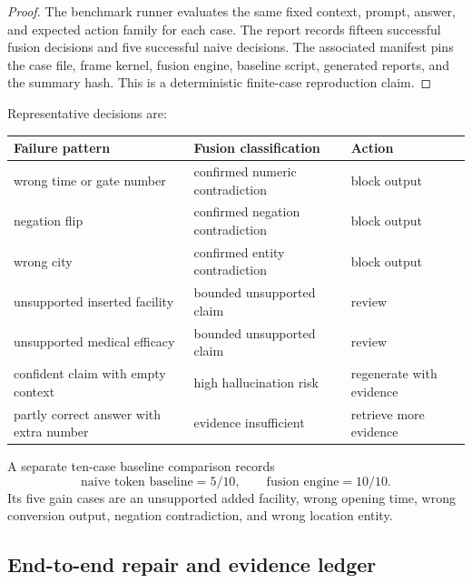 \begin{proof}
The benchmark runner evaluates the same fixed context, prompt, answer, and expected action family for each case. The report records fifteen successful fusion decisions and five successful naive decisions. The associated manifest pins the case file, frame kernel, fusion engine, baseline script, generated reports, and the summary hash. This is a deterministic finite-case reproduction claim.
\end{proof}

Representative decisions are:
\begin{center}
\begin{tabular}{>{\raggedright\arraybackslash}p{}>{\raggedright\arraybackslash}p{}>{\raggedright\arraybackslash}p{}}
\toprule
Failure pattern & Fusion classification & Action\\
\midrule
wrong time or gate number & confirmed numeric contradiction & block output\\
negation flip & confirmed negation contradiction & block output\\
wrong city & confirmed entity contradiction & block output\\
unsupported inserted facility & bounded unsupported claim & review\\
unsupported medical efficacy & bounded unsupported claim & review\\
confident claim with empty context & high hallucination risk & regenerate with evidence\\
partly correct answer with extra number & evidence insufficient & retrieve more evidence\\
\bottomrule
\end{tabular}
\end{center}
A separate ten-case baseline comparison records
\[
 \text{naive token baseline}=5/10,
 \qquad
 \text{fusion engine}=10/10.
\]
Its five gain cases are an unsupported added facility, wrong opening time, wrong conversion output, negation contradiction, and wrong location entity.

\subsection{End-to-end repair and evidence ledger}

